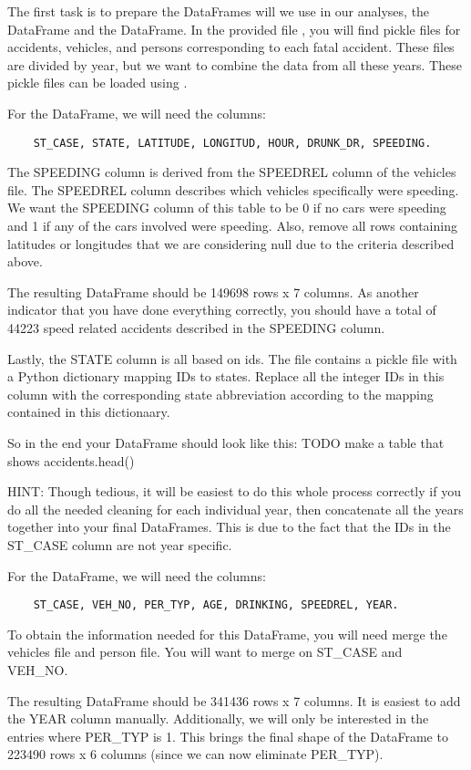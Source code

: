 The first task is to prepare the DataFrames will we use in our analyses,
the  DataFrame and the  DataFrame.
In the provided file , you will find pickle files for accidents,
vehicles, and persons corresponding to each fatal accident. These files are
divided by year, but we want to combine the data from all these years. These
pickle files can be loaded using .

\begin{problem}
For the  DataFrame, we will need the columns:
\begin{lstlisting}
    ST_CASE, STATE, LATITUDE, LONGITUD, HOUR, DRUNK_DR, SPEEDING.
\end{lstlisting}

The SPEEDING column is derived from
the SPEEDREL column of the vehicles file. The SPEEDREL column describes
which vehicles specifically were speeding. We want the SPEEDING column of this
table to be 0 if no cars were speeding and 1 if any of the cars involved were
speeding. Also, remove all rows containing latitudes or longitudes that we are
considering null due to the criteria described above.

The resulting DataFrame should be 149698 rows x 7 columns. As
another indicator that you have done everything correctly, you should have a total
of 44223 speed related accidents described in the SPEEDING column.

Lastly, the STATE column is all based on ids. The  file
contains a pickle file with a Python dictionary mapping IDs to states. Replace
all the integer IDs in this column with the corresponding state abbreviation
according to the mapping contained in this dictionaary.

So in the end your DataFrame should look like this:
TODO make a table that shows accidents.head()

\begin{info}
HINT: Though tedious, it will be easiest to do this whole process correctly if
you do all the needed cleaning for each individual year, then concatenate all
the years together into your final DataFrames. This is due to the fact that
the IDs in the ST\_CASE column are not year specific.
\end{info}
\end{problem}

\begin{problem}
For the  DataFrame, we will need the columns:
\begin{lstlisting}
    ST_CASE, VEH_NO, PER_TYP, AGE, DRINKING, SPEEDREL, YEAR.
\end{lstlisting}
To obtain the information needed
for this DataFrame, you will need merge the vehicles
file and person file. You will want to merge on ST\_CASE and VEH\_NO.

The resulting DataFrame should be 341436 rows x 7 columns. It is easiest to add
the YEAR column manually. Additionally, we will
only be interested in the entries where PER\_TYP is 1. This brings the final
shape of the DataFrame to 223490 rows x 6 columns (since we can now eliminate
PER\_TYP).
\end{problem}

